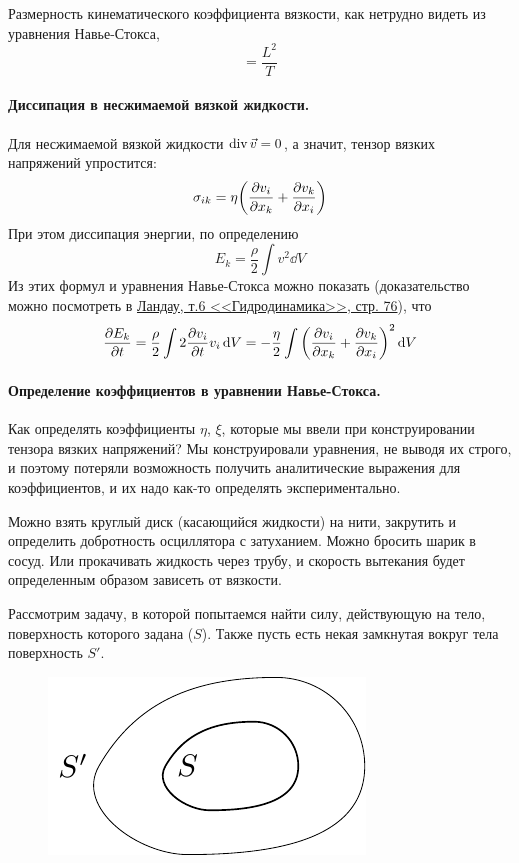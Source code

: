 Размерность кинематического коэффициента вязкости, как нетрудно видеть из уравнения Навье-Стокса,
\begin{equation}
    [\nu] = \frac{L^2}{T}
\end{equation}

\paragraph{Диссипация в несжимаемой вязкой жидкости.} Для несжимаемой вязкой жидкости $\operatorname{div} \vec{v}=0$, а значит, тензор вязких напряжений упростится:
\begin{equation}
	 \sigma_{ik} = \eta\qty(\pdv{v_i}{x_k}+\pdv{v_k}{x_i})
\end{equation}
При этом диссипация энергии, по определению
\begin{equation}
	E_k = \frac{\rho}{2}\int v^2 \dd{V}
\end{equation}
Из этих формул и уравнения Навье-Стокса можно показать (доказательство можно посмотреть в \href{http://www.immsp.kiev.ua/postgraduate/Biblioteka_trudy/GidrodinamikaLanday1986.pdf#page=76}{Ландау, т.6 <<Гидродинамика>>, стр. 76}), что 
\begin{equation}
    \pdv{E_k}{t} = \frac{\rho}{2} \int 2\pdv{v_i}{t} v_i \dd{V}=
    -\frac{\eta}{2} \int   \qty(\pdv{v_i}{x_k}+\pdv{v_k}{x_i})^2 \dd{V}
\end{equation}

\paragraph{Определение коэффициентов в уравнении Навье-Стокса.} Как определять коэффициенты $\eta$, $\xi$, которые мы ввели при конструировании тензора вязких напряжений? Мы конструировали уравнения, не выводя их строго, и поэтому потеряли возможность получить аналитические выражения для коэффициентов, и их надо как-то определять экспериментально.

Можно взять круглый диск (касающийся жидкости) на нити, закрутить и определить добротность осциллятора с затуханием. Можно бросить шарик в сосуд. Или прокачивать жидкость через трубу, и скорость вытекания будет определенным образом зависеть от вязкости.

Рассмотрим задачу, в которой попытаемся найти силу, действующую на тело, поверхность которого задана ($S$). Также пусть есть некая замкнутая вокруг тела поверхность $S'$.

\begin{figure}[h!]
    \centering
    \includegraphics[scale=1]{img/voda}
    \caption{}
    \label{fig:figure1}
\end{figure}

